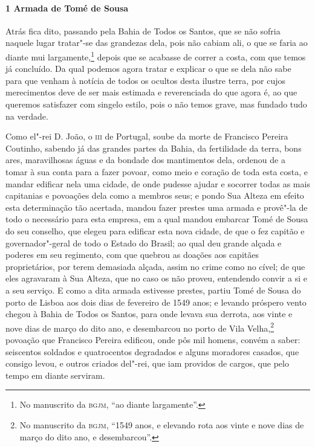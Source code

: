 \paragraph{1 Armada de Tomé de Sousa}

Atrás fica dito, passando pela Bahia de Todos os Santos, que se não sofria naquele lugar
tratar"-se das grandezas dela, pois não cabiam ali, o que se faria ao diante mui
largamente,\footnote{ No manuscrito da \textsc{bgjm}, ``ao diante largamente''.} depois
que se acabasse de correr a costa, com que temos já concluído. Da qual podemos agora
tratar e explicar o que se dela não sabe para que venham à notícia de todos os ocultos
desta ilustre terra, por cujos merecimentos deve de ser mais estimada e reverenciada do
que agora é, ao que queremos satisfazer com singelo estilo, pois o não temos grave, mas
fundado tudo na verdade.

Como el"-rei D. João, o \textsc{iii} de Portugal, soube da morte de Francisco Pereira
Coutinho, sabendo já das grandes partes da Bahia, da fertilidade da terra, bons ares,
maravilhosas águas e da bondade dos mantimentos dela, ordenou de a tomar à sua conta para
a fazer povoar, como meio e coração de toda esta costa, e mandar edificar nela uma cidade,
de onde pudesse ajudar e socorrer todas as mais capitanias e povoações dela como a membros
seus; e pondo Sua Alteza em efeito esta determinação tão acertada, mandou fazer prestes
uma armada e provê"-la de todo o necessário para esta empresa, em a qual mandou embarcar
Tomé de Sousa do seu conselho, que elegeu para edificar esta nova cidade, de que o fez
capitão e governador"-geral de todo o Estado do Brasil; ao qual deu grande alçada e poderes
em seu regimento, com que quebrou as doações aos capitães proprietários, por terem
demasiada alçada, assim no crime como no cível; de que eles agravaram à Sua Alteza, que no
caso os não proveu, entendendo convir a si e a seu serviço. E como a dita armada estivesse
prestes, partiu Tomé de Sousa do porto de Lisboa aos dois dias de fevereiro de 1549 anos;
e levando próspero vento chegou à Bahia de Todos os Santos, para onde levava sua derrota,
aos vinte e nove dias de março do dito ano, e desembarcou no porto de Vila
Velha,\footnote{ No manuscrito da \textsc{bgjm}, ``1549 anos, e elevando rota aos vinte e
nove dias de março do dito ano, e desembarcou''.} povoação que Francisco Pereira edificou,
onde pôs mil homens, convém a saber: seiscentos soldados e quatrocentos degradados e
alguns moradores casados, que consigo levou, e outros criados del"-rei, que iam providos de
cargos, que pelo tempo em diante serviram.

